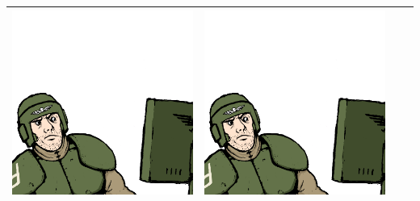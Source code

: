 \documentclass{article}
\begin{document}
\begin{center}
\begin{tabular}{|c| c |c|c|}
			\includegraphics[scale=0.05]{wat}&
			\includegraphics[angle=70, scale = 0.05]{wat} \\
			\hline
		\end{tabular}
	\end{center}
\end{document}

